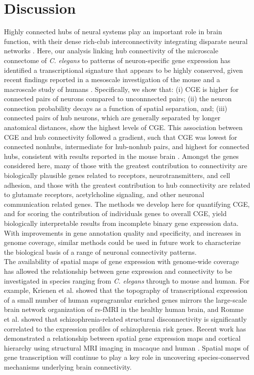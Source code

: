 \documentclass[10pt,letterpaper]{article}
\begin{document}
{\section*{Discussion}
Highly connected hubs of neural systems play an important role in brain function, with their dense rich-club interconnectivity integrating disparate neural networks \cite{vandenHeuvel:2013ge, Fornito2015, deReus:2013cy, vandenHeuvel:2013ij}.
Here, our analysis linking hub connectivity of the microscale connectome of \emph{C. elegans} to patterns of neuron-specific gene expression has identified a transcriptional signature that appears to be highly conserved, given recent findings reported in a mesoscale investigation of the mouse \cite{Fulcher:2016ck} and a macroscale study of humans \cite{Vertes2016a}.
Specifically, we show that:
(i) CGE is higher for connected pairs of neurons compared to unconnnected pairs;
(ii) the neuron connection probability decays as a function of spatial separation, and;
(iii) connected pairs of hub neurons, which are generally separated by longer anatomical distances, show the highest levels of CGE.
This association between CGE and hub connectivity followed a gradient, such that CGE was lowest for connected nonhubs, intermediate for hub-nonhub pairs, and highest for connected hubs, consistent with results reported in the mouse brain \cite{Fulcher:2016ck}.
Amongst the genes considered here, many of those with the greatest contribution to connectivity are biologically plausible genes related to receptors, neurotransmitters, and cell adhesion, and those with the greatest contribution to hub connectivity are related to glutamate receptors, acetylcholine signaling, and other neuronal communication related genes.
The methods we develop here for quantifying CGE, and for scoring the contribution of individuals genes to overall CGE, yield biologically interpretable results from incomplete binary gene expression data.
With improvements in gene annotation quality and specificity, and increases in genome coverage, similar methods could be used in future work to characterize the biological basis of a range of neuronal connectivity patterns.\\

The availability of spatial maps of gene expression with genome-wide coverage has allowed the relationship between gene expression and connectivity to be investigated in species ranging from \textit{C. elegans} through to mouse and human.
For example, Krienen et al. \cite{Krienen:2016eq} showed that the topography of transcriptional expression of a small number of human supragranular enriched genes mirrors the large-scale brain network organization of rs-fMRI in the healthy human brain, and Romme et al. \cite{Romme2016} showed that schizophrenia-related structural disconnectivity is significantly correlated to the expression profiles of schizophrenia risk genes.
Recent work has demonstrated a relationship between spatial gene expression maps and cortical hierarchy using structural MRI imaging in macaque and human \cite{Burt2017}.
Spatial maps of gene transcription will continue to play a key role in uncovering species-conserved mechanisms underlying brain connectivity.

}
\end{document}
